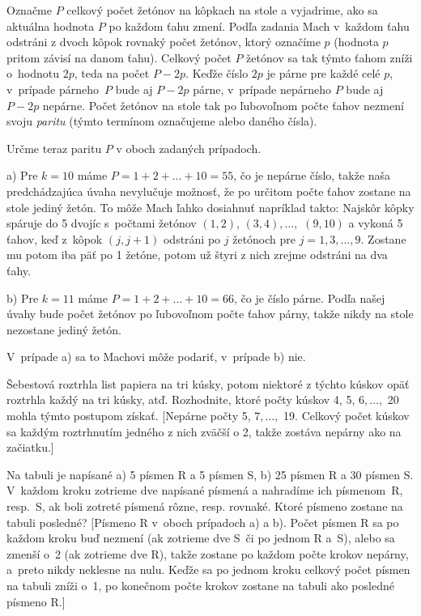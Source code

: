 {%
Označme $P$ celkový počet žetónov na kôpkach na stole a
vyjadrime, ako sa aktuálna hodnota $P$ po každom ťahu zmení.
Podľa zadania Mach v~každom ťahu odstráni z dvoch
kôpok rovnaký počet žetónov, ktorý označíme $p$ (hodnota $p$
pritom závisí na danom ťahu). Celkový počet $P$ žetónov sa tak
týmto ťahom zníži o~hodnotu $2p$, teda na počet $P-2p$.
Keďže číslo $2p$ je párne pre
každé celé $p$, v~prípade párneho~$P$ bude aj $P-2p$ párne, v~prípade
nepárneho $P$ bude aj $P-2p$ nepárne. Počet žetónov na stole
tak po ľubovoľnom počte ťahov nezmení svoju {\it paritu\/}
(týmto termínom označujeme  alebo  daného
čísla).

Určme teraz paritu $P$ v oboch zadaných prípadoch.
\item{a)}
Pre $k=10$ máme $P=1+2+\dots+10=55$, čo je nepárne
číslo, takže naša predchádzajúca úvaha nevylučuje možnosť, že po
určitom počte ťahov zostane na stole jediný žetón.
To môže Mach ľahko dosiahnuť napríklad takto: Najskôr
kôpky spáruje do 5 dvojíc s~počtami žetónov $(1,2)$,
$(3,4),\dots,$ $(9,10)$ a vykoná 5 ťahov, keď
z~kôpok $(j,j+1)$ odstráni po $j$ žetónoch pre $j=1,3,\dots,9$.
Zostane mu potom iba päť  po 1 žetóne, potom už
štyri z nich zrejme odstráni na dva ťahy.

\item{b)}
Pre $k=11$ máme $P=1+2+\dots+10=66$, čo je číslo párne.
Podľa našej úvahy bude počet žetónov po ľubovoľnom počte ťahov
párny, takže nikdy na stole nezostane jediný žetón.

\zaver
V~prípade a) sa to Machovi môže podariť, v~prípade
b) nie.

Šebestová roztrhla list papiera na tri kúsky, potom niektoré z týchto
kúskov opäť roztrhla každý na tri kúsky, atď.
Rozhodnite, ktoré počty kúskov 4, 5, $6,\dots,$ 20
mohla týmto postupom získať. [Nepárne počty 5, $7,\dots,$ 19.
Celkový počet kúskov sa každým roztrhnutím jedného z nich zväčší o 2,
takže zostáva nepárny ako na začiatku.]

Na tabuli je napísané a) 5 písmen R a 5 písmen S,
b) 25 písmen R a 30 písmen S. V~každom kroku
zotrieme dve napísané písmená a nahradíme ich písmenom~R, resp.~S,
ak boli zotreté písmená rôzne, resp. rovnaké. Ktoré písmeno
zostane na tabuli posledné? [Písmeno R v~oboch prípadoch a)
a b). Počet písmen R sa po každom kroku buď
nezmení (ak zotrieme dve S~či po jednom R a~S), alebo sa
zmenší o~2 (ak zotrieme dve R), takže zostane po každom
počte krokov nepárny, a~preto nikdy neklesne na nulu.
Keďže sa po jednom kroku celkový počet písmen na tabuli zníži o~1,
po konečnom počte krokov zostane na tabuli ako posledné písmeno R.]

}
